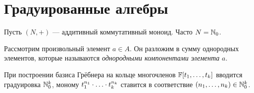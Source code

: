 \section{Градуированные алгебры}
Пусть $(N, +)$ --- аддитивный коммутативный моноид.
Часто $N = \mathbb{N}_0$.

Рассмотрим произвольный элемент $a \in A$.
Он разложим в сумму однородных элементов, которые называются \textit{однородными компонентами элемента} $a$.

При построении базиса Грёбнера на кольце многочленов $\mathbb{F}[t_1, \dots, t_k]$ вводится градуировка $\mathbb{N}_0^k$, моному $t_1^{n_1} \cdot\ldots\cdot t_k^{n_k}$ ставится в соответствие $(n_1, \dots, n_k) \in \mathbb{N}_0^k$.

